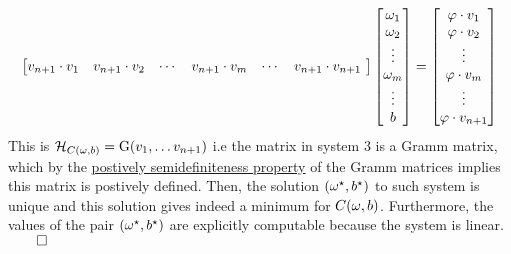 \documentclass{exam}
\renewenvironment{proof}{{\noindent\itshape\ignorespaces}}{{\hfill$\qed$\\}}
\begin{document}
\begin{proof}
\begin{equation}
\begin{bmatrix}
       v_{n+1}\cdot v_1 & v_{n+1} \cdot v_2 & \cdots & v_{n+1} \cdot v_m & \cdots & v_{n+1} \cdot v_{n+1}\
    \end{bmatrix}
    \begin{bmatrix}
        \omega_1 \\
        \omega_2\\
        \vdots \\
        \omega_m\\
       \vdots \\
        b
    \end{bmatrix} 
    = \begin{bmatrix}
        \bold{\varphi} \cdot v_1\\
        \bold{\varphi} \cdot v_2\\
        \vdots \\
        \bold{\varphi} \cdot v_m\\
       \vdots \\
       \bold{\varphi} \cdot v_{n+1}
    \end{bmatrix} 
\end{equation}
This is  $\mathcal{H}_{C(\tiny \omega, b)} = \text{G}(v_1, \ldots v_{n+1})$ i.e the matrix in system $3$ is a Gramm matrix, which by the \href{https://en.wikipedia.org/wiki/Gram_matrix}{postively semidefiniteness property} of the Gramm matrices implies this matrix is postively defined. Then, the solution $(\bold{\omega}^{\star}, b^{\star})$ to such system is unique and this solution gives indeed a minimum for $C(\bold{\omega},b)$. Furthermore, the values of the pair $(\bold{\omega}^{\star}, b^{\star})$ are explicitly computable because 
the system is linear. 
\end{proof}
\end{document}
